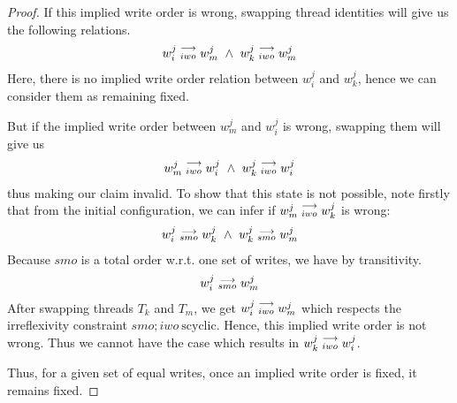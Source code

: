 \begin{proof}
            If this implied write order is wrong, swapping thread identities will give us the following relations. 
            \begin{align}
                \reln{w_i^j}{iwo}{w_m^j} \ \wedge \ \reln{w_k^j}{iwo}{w_m^j}
            \end{align}
            Here, there is no implied write order relation between $w_i^j$ and $w_k^j$, hence we can consider them as remaining fixed. 

            But if the implied write order between $w_m^j$ and $w_i^j$ is wrong, swapping them will give us 
            \begin{align}
                \reln{w_m^j}{iwo}{w_i^j} \ \wedge \ \reln{w_k^j}{iwo}{w_i^j}  
            \end{align}
            thus making our claim invalid. To show that this state is not possible, note firstly that from the initial configuration, we can infer if $w_m^j\stackrel{\longrightarrow}{_{iwo}}w_k^j$ is wrong:
            \begin{align}
                \reln{w_i^j}{smo}{w_k^j} \ \wedge \ \reln{w_k^j}{smo}{w_m^j}
            \end{align} 
            Because $smo$ is a total order w.r.t. one set of writes, we have by transitivity. 
            \begin{align}
                w_i^j\stackrel{\longrightarrow}{_{smo}}w_m^j
            \end{align}
            After swapping threads $T_k$ and $T_m$, we get $w_i^j\stackrel{\longrightarrow}{_{iwo}}w_m^j$ which respects the irreflexivity constraint $smo;iwo \ \text{scyclic}$. Hence, this implied write order is not wrong. Thus we cannot have the case which results in $w_k^j\stackrel{\longrightarrow}{_{iwo}}w_i^j$.  

            Thus, for a given set of equal writes, once an implied write order is fixed, it remains fixed.
        \end{proof}

